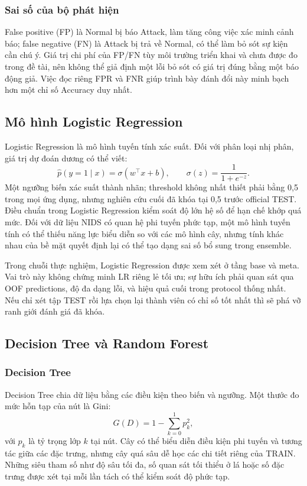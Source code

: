 \subsubsection{Sai số của bộ phát hiện}
False positive (FP) là Normal bị báo Attack, làm tăng công việc xác minh cảnh báo; false negative (FN) là Attack bị trả về Normal, có thể làm bỏ sót sự kiện cần chú ý. Giá trị chi phí của FP/FN tùy môi trường triển khai và chưa được đo trong đề tài, nên không thể giả định một lỗi bỏ sót có giá trị đúng bằng một báo động giả. Việc đọc riêng FPR và FNR giúp trình bày đánh đổi này minh bạch hơn một chỉ số Accuracy duy nhất.

\subsection{Mô hình Logistic Regression}
Logistic Regression là mô hình tuyến tính xác suất. Đối với phân loại nhị phân, giá trị dự đoán dương có thể viết:
\begin{equation}
\widehat p(y=1\mid x)=\sigma(w^\top x+b),\qquad \sigma(z)=\frac{1}{1+e^{-z}}.
\label{eq:lr}
\end{equation}
Một ngưỡng biến xác suất thành nhãn; threshold không nhất thiết phải bằng 0,5 trong mọi ứng dụng, nhưng nghiên cứu cuối đã khóa tại 0,5 trước official TEST. Điều chuẩn trong Logistic Regression kiểm soát độ lớn hệ số để hạn chế khớp quá mức. Đối với dữ liệu NIDS có quan hệ phi tuyến phức tạp, một mô hình tuyến tính có thể thiếu năng lực biểu diễn so với các mô hình cây, nhưng tính khác nhau của bề mặt quyết định lại có thể tạo dạng sai số bổ sung trong ensemble.

Trong chuỗi thực nghiệm, Logistic Regression được xem xét ở tầng base và meta. Vai trò này không chứng minh LR riêng lẻ tối ưu; sự hữu ích phải quan sát qua OOF predictions, độ đa dạng lỗi, và hiệu quả cuối trong protocol thống nhất. Nếu chỉ xét tập TEST rồi lựa chọn lại thành viên có chỉ số tốt nhất thì sẽ phá vỡ ranh giới đánh giá đã khóa.

\subsection{Decision Tree và Random Forest}
\subsubsection{Decision Tree}
Decision Tree chia dữ liệu bằng các điều kiện theo biến và ngưỡng. Một thước đo mức hỗn tạp của nút là Gini:
\begin{equation}
G(D)=1-\sum_{k=0}^{1}p_k^2,
\label{eq:gini}
\end{equation}
với $p_k$ là tỷ trọng lớp $k$ tại nút. Cây có thể biểu diễn điều kiện phi tuyến và tương tác giữa các đặc trưng, nhưng cây quá sâu dễ học các chi tiết riêng của TRAIN. Những siêu tham số như độ sâu tối đa, số quan sát tối thiểu ở lá hoặc số đặc trưng được xét tại mỗi lần tách có thể kiểm soát độ phức tạp.


